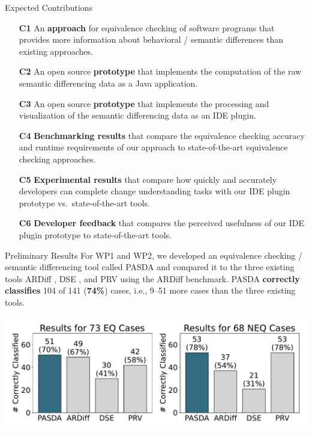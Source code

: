 \documentclass[final,hyperref={pdfpagelabels=false}]{beamer}
\newcommand{\shrink}{-15pt}
\begin{document}
\begin{frame}[t]
\begin{columns}[t]
  \begin{column}{.45\textwidth} %
    \vspace{\shrink}
    \begin{block}{Expected Contributions}
      \begin{itemize}
        \item[\textbf{C1}] An \textbf{approach} for equivalence checking of software programs that provides more information about behavioral / semantic differences than existing approaches.
        \item[\textbf{C2}] An open source \textbf{prototype} that implements the computation of the raw semantic differencing data as a Java application.
        \item[\textbf{C3}] An open source \textbf{prototype} that implements the processing and visualization of the semantic differencing data as an IDE plugin.
        \item[\textbf{C4}] \textbf{Benchmarking results} that compare the equivalence checking accuracy and runtime requirements of our approach to state-of-the-art equivalence checking approaches.
        \item[\textbf{C5}] \textbf{Experimental results} that compare how quickly and accurately developers can complete change understanding tasks with our IDE plugin prototype vs.\ state-of-the-art tools.
        \item[\textbf{C6}] \textbf{Developer feedback} that compares the perceived usefulness of our IDE plugin prototype to state-of-the-art tools.
      \end{itemize}
    \end{block}

    \begin{block}{Preliminary Results}
      For WP1 and WP2, we developed an equivalence checking / semantic differencing tool called PASDA \cite{glock2024pasda} and compared it to the three existing tools ARDiff \cite{badihi2020ardiff}, DSE \cite{person2008dse}, and PRV \cite{boehme2013prv} using the ARDiff benchmark.  PASDA \textbf{correctly classifies} 104 of 141 (\textbf{74\%}) cases, i.e., 9--51 more cases than the three existing tools.

      \vspace{-4pt}
      \begin{center}
        \includegraphics[width=\columnwidth]{classification-accuracy}
      \end{center}
      \vspace{-19.1pt}


\end{block}
\end{column}
\end{columns}
\end{frame}
\end{document}
